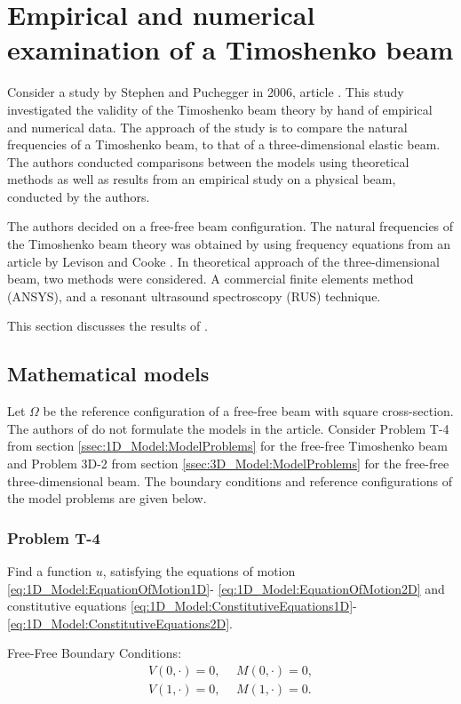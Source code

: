 \documentclass[../../main.tex]{subfiles}
\begin{document}
\section{Empirical and numerical examination of a Timoshenko beam} \label{sec:SP06}
Consider a study by Stephen and Puchegger in 2006, article \cite{SP06}. This study investigated the validity of the Timoshenko beam theory by hand of empirical and numerical data. The approach of the study is to compare the natural frequencies of a Timoshenko beam, to that of a three-dimensional elastic beam. The authors conducted comparisons between the models using theoretical methods as well as results from an empirical study on a physical beam, conducted by the authors.

The authors decided on a free-free beam configuration. The natural frequencies of the Timoshenko beam theory was obtained by using frequency equations from an article by Levison and Cooke \cite{LC81}. In theoretical approach of the three-dimensional beam, two methods were considered. A commercial finite elements method (ANSYS), and a resonant ultrasound spectroscopy (RUS) technique.

This section discusses the results of \cite{SP06}.

\subsection{Mathematical models}
Let $\Omega$ be the reference configuration of a free-free beam with square cross-section. The authors of \cite{SP06} do not formulate the models in the article. Consider Problem T-4 from section \ref{ssec:1D_Model:ModelProblems} for the free-free Timoshenko beam and Problem 3D-2 from section \ref{ssec:3D_Model:ModelProblems} for the free-free three-dimensional beam. The boundary conditions and reference configurations of the model problems are given below.

\subsubsection*{Problem T-4}
Find a function $u$, satisfying the equations of motion \eqref{eq:1D_Model:EquationOfMotion1D}- \eqref{eq:1D_Model:EquationOfMotion2D} and constitutive equations \eqref{eq:1D_Model:ConstitutiveEquations1D}- \eqref{eq:1D_Model:ConstitutiveEquations2D}.

{Free-Free Boundary Conditions:}
\begin{eqnarray}
	V(0,\cdot) = 0, \ \ &M(0,\cdot) = 0, \label{BC_1}\\
	V(1,\cdot) = 0, \ \ &M(1,\cdot) = 0. \label{BC_2}
\end{eqnarray}
\end{document}
